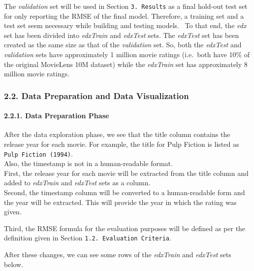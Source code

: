 \documentclass[
]{article}
\begin{document}
The \emph{validation} set will be used in Section \texttt{3.\ Results}
as a final hold-out test set for only reporting the RMSE of the final
model. Therefore, a training set and a test set seem necessary while
building and testing models.~ To that end, the \emph{edx} set has been
divided into \emph{edxTrain} and \emph{edxTest} sets. The \emph{edxTest}
set has been created as the same size as that of the \emph{validation}
set. So, both the \emph{edxTest} and \emph{validation} sets have
approximately 1 million movie ratings (i.e.~both have 10\% of the
original MovieLens 10M dataset) while the \emph{edxTrain} set has
approximately 8 million movie ratings.

\hypertarget{data-preparation-and-data-visualization}{%
\subsubsection{2.2. Data Preparation and Data
Visualization}\label{data-preparation-and-data-visualization}}

\hypertarget{data-preparation-phase}{%
\paragraph{2.2.1. Data Preparation Phase}\label{data-preparation-phase}}

\hfill\break
\hfill\break
After the data exploration phase, we see that the title column contains
the release year for each movie. For example, the title for Pulp Fiction
is listed as \texttt{Pulp\ Fiction\ (1994)}.\\
Also, the timestamp is not in a human-readable format.\\
First, the release year for each movie will be extracted from the title
column and added to \emph{edxTrain} and \emph{edxTest} sets as a
column.\\
Second, the timestamp column will be converted to a human-readable form
and the year will be extracted. This will provide the year in which the
rating was given.

Third, the RMSE formula for the evaluation purposes will be defined as
per the definition given in Section \texttt{1.2.\ Evaluation\ Criteria}.

After these changes, we can see some rows of the \emph{edxTrain} and
\emph{edxTest} sets below.
\end{document}

